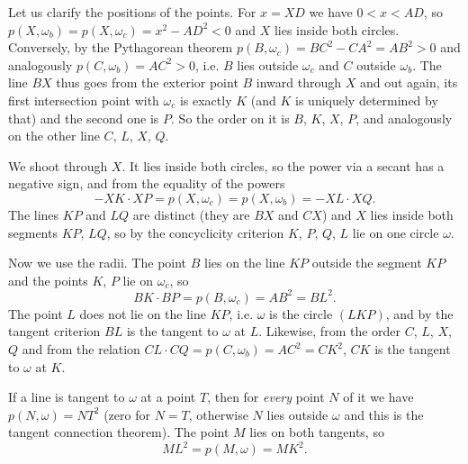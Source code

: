 {    Let us clarify the positions of the points. For $x=XD$ we have $0 < x < AD$, so $p(X,\omega_b) = p(X,\omega_c) = x^2 - AD^2 < 0$ and $X$ lies inside both circles. Conversely, by the Pythagorean theorem $p(B,\omega_c) = BC^2 - CA^2 = AB^2 > 0$ and analogously $p(C,\omega_b) = AC^2 > 0$, i.e. $B$ lies outside $\omega_c$ and $C$ outside $\omega_b$. The line $BX$ thus goes from the exterior point $B$ inward through $X$ and out again, its first intersection point with $\omega_c$ is exactly $K$ (and $K$ is uniquely determined by that) and the second one is $P$. So the order on it is $B$, $K$, $X$, $P$, and analogously on the other line $C$, $L$, $X$, $Q$.

    We shoot through $X$. It lies inside both circles, so the power via a secant has a negative sign, and from the equality of the powers
    $$
    -XK \cdot XP = p(X,\omega_c) = p(X,\omega_b) = -XL \cdot XQ.
    $$
    The lines $KP$ and $LQ$ are distinct (they are $BX$ and $CX$) and $X$ lies inside both segments $KP$, $LQ$, so by the concyclicity criterion $K$, $P$, $Q$, $L$ lie on one circle $\omega$.

    Now we use the radii. The point $B$ lies on the line $KP$ outside the segment $KP$ and the points $K$, $P$ lie on $\omega_c$, so
    $$
    BK \cdot BP = p(B,\omega_c) = AB^2 = BL^2.
    $$
    The point $L$ does not lie on the line $KP$, i.e. $\omega$ is the circle $(LKP)$, and by the tangent criterion $BL$ is the tangent to $\omega$ at $L$. Likewise, from the order $C$, $L$, $X$, $Q$ and from the relation $CL \cdot CQ = p(C,\omega_b) = AC^2 = CK^2$, $CK$ is the tangent to $\omega$ at $K$.

    If a line is tangent to $\omega$ at a point $T$, then for \textit{every} point $N$ of it we have $p(N,\omega) = NT^2$ (zero for $N=T$, otherwise $N$ lies outside $\omega$ and this is the tangent connection theorem). The point $M$ lies on both tangents, so
    $$
    ML^2 = p(M,\omega) = MK^2.
    $$
}

